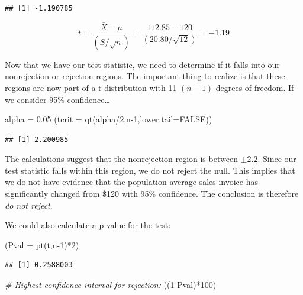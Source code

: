 \documentclass[
]{book}
\newenvironment{Shaded}{\begin{snugshade}}{\end{snugshade}}
\newcommand{\AttributeTok}[1]{\textcolor[rgb]{0.77,0.63,0.00}{#1}}
\newcommand{\CommentTok}[1]{\textcolor[rgb]{0.56,0.35,0.01}{\textit{#1}}}
\newcommand{\ConstantTok}[1]{\textcolor[rgb]{0.00,0.00,0.00}{#1}}
\newcommand{\DecValTok}[1]{\textcolor[rgb]{0.00,0.00,0.81}{#1}}
\newcommand{\FloatTok}[1]{\textcolor[rgb]{0.00,0.00,0.81}{#1}}
\newcommand{\FunctionTok}[1]{\textcolor[rgb]{0.00,0.00,0.00}{#1}}
\newcommand{\NormalTok}[1]{#1}
\newcommand{\OtherTok}[1]{\textcolor[rgb]{0.56,0.35,0.01}{#1}}
\newcommand{\SpecialCharTok}[1]{\textcolor[rgb]{0.00,0.00,0.00}{#1}}
\begin{document}
\begin{verbatim}
## [1] -1.190785
\end{verbatim}

\[ t = \frac{\bar{X}-\mu}{\left(S / \sqrt{n} \right)}=\frac{112.85-120}{\left(20.80 / \sqrt{12} \right)}=-1.19\]

Now that we have our test statistic, we need to determine if it falls into our nonrejection or rejection regions. The important thing to realize is that these regions are now part of a t distribution with 11 \((n-1)\) degrees of freedom. If we consider 95\% confidence\ldots{}

\begin{Shaded}
\begin{Highlighting}[]
\NormalTok{alpha }\OtherTok{=} \FloatTok{0.05}
\NormalTok{(}\AttributeTok{tcrit =} \FunctionTok{qt}\NormalTok{(alpha}\SpecialCharTok{/}\DecValTok{2}\NormalTok{,n}\DecValTok{{-}1}\NormalTok{,}\AttributeTok{lower.tail=}\ConstantTok{FALSE}\NormalTok{))}
\end{Highlighting}
\end{Shaded}

\begin{verbatim}
## [1] 2.200985
\end{verbatim}

The calculations suggest that the nonrejection region is between \(\pm 2.2\). Since our test statistic falls within this region, we do not reject the null. This implies that we do not have evidence that the population average sales invoice has significantly changed from \$120 with 95\% confidence. The conclusion is therefore \emph{do not reject}.

We could also calculate a p-value for the test:

\begin{Shaded}
\begin{Highlighting}[]
\NormalTok{(}\AttributeTok{Pval =} \FunctionTok{pt}\NormalTok{(t,n}\DecValTok{{-}1}\NormalTok{)}\SpecialCharTok{*}\DecValTok{2}\NormalTok{)}
\end{Highlighting}
\end{Shaded}

\begin{verbatim}
## [1] 0.2588003
\end{verbatim}

\begin{Shaded}
\begin{Highlighting}[]
\CommentTok{\# Highest confidence interval for rejection:}
\NormalTok{((}\DecValTok{1}\SpecialCharTok{{-}}\NormalTok{Pval)}\SpecialCharTok{*}\DecValTok{100}\NormalTok{)}
\end{Highlighting}
\end{Shaded}
\end{document}
